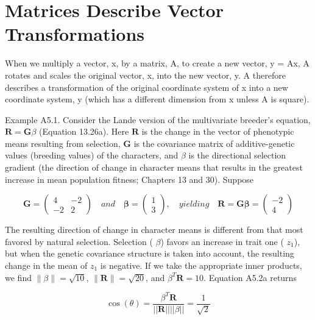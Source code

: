 \documentclass{article}
\begin{document}
\section{Matrices Describe Vector Transformations}
When we multiply a vector, x, by a matrix, A, to create a new vector, y = Ax, A rotates and scales the original vector, x, into the new vector, y. A therefore describes a transformation of the original coordinate system of x into a new coordinate system, y (which has a different dimension from x unless A is square).

Example A5.1. Consider the Lande version of the multivariate breeder’s equation,  $ \mathbf{R} = \mathbf{G}\beta $ (Equation 13.26a). Here  $ \mathbf{R} $ is the change in the vector of phenotypic means resulting from selection,  $ \mathbf{G} $ is the covariance matrix of additive-genetic values (breeding values) of the characters, and  $ \beta $ is the directional selection gradient (the direction of change in character means that results in the greatest increase in mean population fitness; Chapters 13 and 30). Suppose

\begin{equation}
\mathbf{G}=\begin{pmatrix}4&-2\\ -2&2\end{pmatrix}\quad and\quad\boldsymbol{\beta}=\begin{pmatrix}1\\ 3\end{pmatrix},\quad yielding\quad\mathbf{R}=\mathbf{G}\boldsymbol{\beta}=\begin{pmatrix}-2\\ 4\end{pmatrix}
\end{equation}

The resulting direction of change in character means is different from that most favored by natural selection. Selection ( $ \beta $) favors an increase in trait one ( $ z_1 $), but when the genetic covariance structure is taken into account, the resulting change in the mean of  $ z_1 $ is negative. If we take the appropriate inner products, we find  $ \|\beta\| = \sqrt{10} $,  $ \|\mathbf{R}\| = \sqrt{20} $, and  $ \beta^T \mathbf{R} = 10 $. Equation A5.2a returns

\begin{equation}
\cos(\theta)=\frac{\beta^{T}\mathbf{R}}{||\mathbf{R}||||\beta||}=\frac{1}{\sqrt{2}}
\end{equation}
\end{document}
